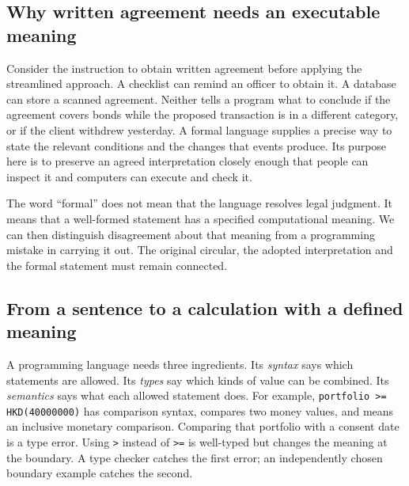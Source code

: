 \subsection{Why written agreement needs an executable meaning}
\label{merge:P-01a-language-lesson:00}

\label{sec:language-lesson}

Consider the instruction to obtain written agreement before applying the
streamlined approach. A checklist can remind an officer to obtain it. A database
can store a scanned agreement. Neither tells a program what to conclude if the
agreement covers bonds while the proposed transaction is in a different category,
or if the client withdrew yesterday. A formal language supplies a precise way
to state the relevant conditions and the changes that events produce. Its
purpose here is to preserve an agreed interpretation closely enough that people
can inspect it and computers can execute and check it.

The word ``formal'' does not mean that the language resolves legal judgment.
It means that a well-formed statement has a specified computational meaning.
We can then distinguish disagreement about that meaning from a programming
mistake in carrying it out. The original circular, the adopted interpretation
and the formal statement must remain connected.

\subsection{From a sentence to a calculation with a defined meaning}
\label{merge:P-01a-language-lesson:01}


A programming language needs three ingredients. Its \emph{syntax} says which
statements are allowed. Its \emph{types} say which kinds of value can be combined.
Its \emph{semantics} says what each allowed statement does. For example,
\texttt{portfolio >= HKD(40000000)} has comparison syntax, compares two money
values, and means an inclusive monetary comparison. Comparing that portfolio
with a consent date is a type error. Using \texttt{>} instead of \texttt{>=} is
well-typed but changes the meaning at the boundary. A type checker catches the
first error; an independently chosen boundary example catches the second.


